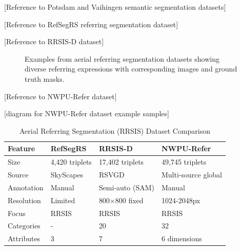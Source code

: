 [Reference to Potsdam and Vaihingen semantic segmentation datasets] %

[Reference to RefSegRS referring segmentation dataset] %

[Reference to RRSIS-D dataset] %

\begin{figure}[htbp]
\centering
{}
\hfill
{}
\caption{Examples from aerial referring segmentation datasets showing diverse referring expressions with corresponding images and ground truth masks.}
\label{fig:aerial_datasets}
\end{figure}

[Reference to NWPU-Refer dataset] %

[diagram for NWPU-Refer dataset example samples]

\begin{table}[htbp]
\centering
\caption{Aerial Referring Segmentation (RRSIS) Dataset Comparison}
\label{tab:rrsis_comparison}
\begin{tabular}{@{}llll@{}}
\toprule
\textbf{Feature} & \textbf{RefSegRS} & \textbf{RRSIS-D} & \textbf{NWPU-Refer} \\
\midrule
Size & 4,420 triplets & 17,402 triplets & 49,745 triplets \\
Source & SkyScapes & RSVGD & Multi-source global \\
Annotation & Manual & Semi-auto (SAM) & Manual \\
Resolution & Limited & 800×800 fixed & 1024-2048px \\
Focus & RRSIS & RRSIS & RRSIS \\
Categories & - & 20 & 32 \\
Attributes & 3 & 7 & 6 dimensions \\
\bottomrule
\end{tabular}
\end{table}

